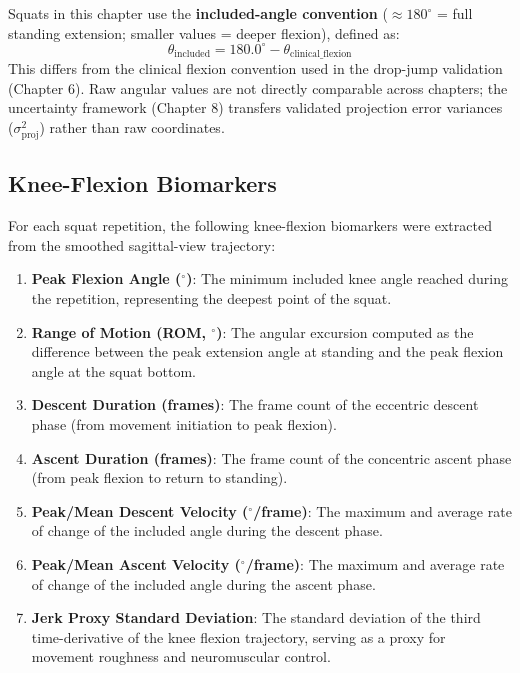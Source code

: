 Squats in this chapter use the \textbf{included-angle convention} ($\approx 180^\circ$ = full standing extension; smaller values = deeper flexion), defined as:
\begin{equation}
  \theta_{\text{included}} = 180.0^\circ - \theta_{\text{clinical\_flexion}}
  \label{eq:disp1}
\end{equation}
This differs from the clinical flexion convention used in the drop-jump validation (Chapter 6). Raw angular values are not directly comparable across chapters; the uncertainty framework (Chapter 8) transfers validated projection error variances ($\sigma^2_{\text{proj}}$) rather than raw coordinates.

\subsection{Knee-Flexion Biomarkers}
\label{sec:4-1-2-knee-flexion-biomarkers}

For each squat repetition, the following knee-flexion biomarkers were extracted from the smoothed sagittal-view trajectory:
\begin{enumerate}
  \item \textbf{Peak Flexion Angle ($^\circ$)}: The minimum included knee angle reached during the repetition, representing the deepest point of the squat.
  \item \textbf{Range of Motion (ROM, $^\circ$)}: The angular excursion computed as the difference between the peak extension angle at standing and the peak flexion angle at the squat bottom.
  \item \textbf{Descent Duration (frames)}: The frame count of the eccentric descent phase (from movement initiation to peak flexion).
  \item \textbf{Ascent Duration (frames)}: The frame count of the concentric ascent phase (from peak flexion to return to standing).
  \item \textbf{Peak/Mean Descent Velocity ($^\circ$/frame)}: The maximum and average rate of change of the included angle during the descent phase.
  \item \textbf{Peak/Mean Ascent Velocity ($^\circ$/frame)}: The maximum and average rate of change of the included angle during the ascent phase.
  \item \textbf{Jerk Proxy Standard Deviation}: The standard deviation of the third time-derivative of the knee flexion trajectory, serving as a proxy for movement roughness and neuromuscular control.
\end{enumerate}




